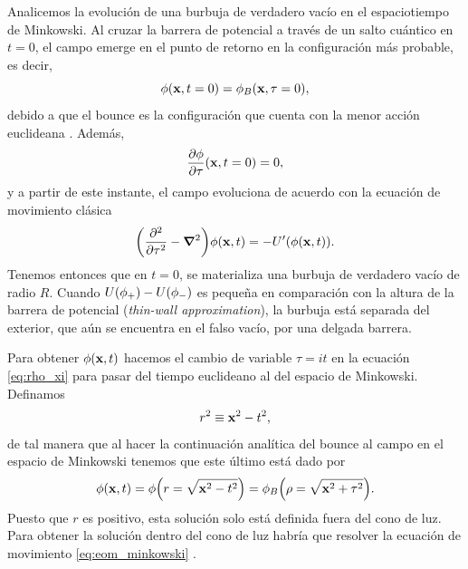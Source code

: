 Analicemos la evolución de una burbuja de verdadero vacío en el espaciotiempo de Minkowski. Al cruzar la barrera de potencial a través de un salto cuántico en $t = 0$, el campo emerge en el punto de retorno en la configuración más probable, es decir, 
\begin{equation}
	\phi\qty(\vb{x}, t = 0) =  \phi_B\qty(\vb{x}, \tau = 0),
\end{equation}
debido a que el bounce es la configuración que cuenta con la menor acción euclideana \cite{rubakov2009classical}. Además, 
\begin{equation} 
\pdv{\phi}{\tau}\qty(\vb{x}, t = 0) = 0,
\end{equation}
y a partir de este instante, el campo evoluciona de acuerdo con la ecuación de movimiento clásica \cite{callan1977fate}
\begin{equation} \label{eq:eom_minkowski}
	\qty(\pdv[2]{\tau} - \grad{}^2)\phi\qty(\vb{x}, t) = -U'\qty(\phi\qty(\vb{x}, t)).
\end{equation}
Tenemos entonces que en $t = 0$, se materializa una burbuja de verdadero vacío de radio $R$. 
Cuando 
$U\qty(\phi_+) - U\qty(\phi_-)$
es pequeña en comparación con la altura de la barrera de potencial (\emph{thin-wall approximation}), la burbuja está separada del exterior, que aún se encuentra en el falso vacío, por una delgada barrera. 

Para obtener $\phi\qty(\vb{x}, t)$ hacemos el cambio de variable $ \tau = it$ en la ecuación \eqref{eq:rho_xi} para pasar del tiempo euclideano al del espacio de Minkowski. Definamos
\begin{equation}
	r^2 \equiv \vb{x}^2 - t^2,
\end{equation}
de tal manera que al hacer la continuación analítica del bounce al campo en el espacio de Minkowski tenemos que este último está dado por
\begin{equation} 
	\phi\qty(\vb{x}, t) = \phi\qty(r = \sqrt{\vb{x}^2 - t^2}) = \phi_B\qty(\rho = \sqrt{\vb{x}^2 + \tau^2}).
\end{equation}
Puesto que $r$ es positivo, esta solución solo está definida fuera del cono de luz. Para obtener la solución dentro del cono de luz habría que resolver la ecuación de movimiento \eqref{eq:eom_minkowski} \cite{weinberg2012classical}. 

